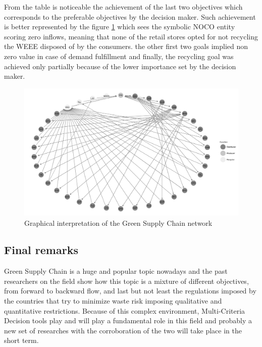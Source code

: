 \begin{doublespace}
From the table is noticeable the achievement of the last two objectives which corresponds to the preferable objectives by the decision maker. Such achievement is better represented by the figure \ref{fig:network} which sees the symbolic NOCO entity scoring zero inflows, meaning that none of the retail stores opted for not recycling the WEEE disposed of by the consumers. the other first two goals implied non zero value in case of demand fulfillment and finally, the recycling goal was achieved only partially because of the lower importance set by the decision maker. 

\begin{figure}
\centering
\includegraphics[width=\textwidth]{Images/network.png}
\caption{Graphical interpretation of the Green Supply Chain network}
\label{fig:network}
\end{figure}

\subsection{Final remarks}
Green Supply Chain is a huge and popular topic nowadays and the past researchers on the field show how this topic is a mixture of different objectives, from forward to backward flow, and last but not least the regulations imposed by the countries that try to minimize waste risk imposing qualitative and quantitative restrictions. Because of this complex environment, Multi-Criteria Decision tools play and will play a fundamental role in this field and probably a new set of researches with the corroboration of the two will take place in the short term.

\end{doublespace}
